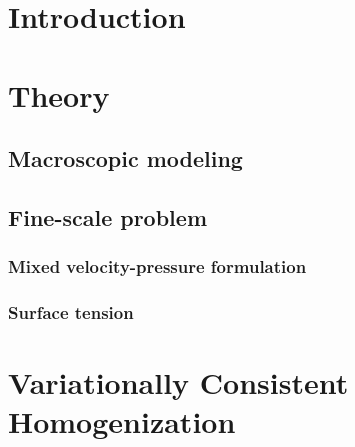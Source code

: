 \documentclass[ExampleMasters.tex]{subfiles}
\begin{document}
\chapter{Introduction}

\chapter{Theory}
\section{Macroscopic modeling}

\section{Fine-scale problem}
\subsection{Mixed velocity-pressure formulation}
\subsection{Surface tension}


\chapter{Variationally Consistent Homogenization}
\end{document}
